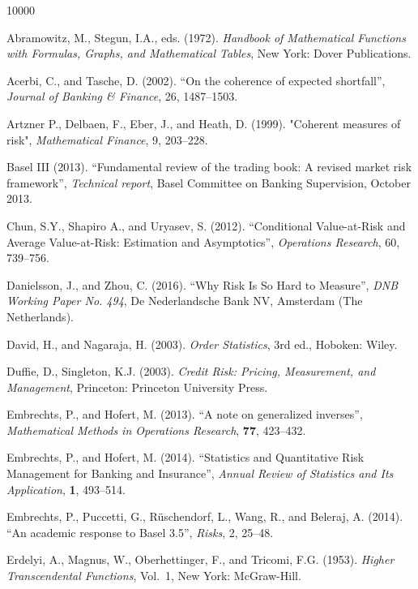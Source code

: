 \documentclass[11pt]{article}
\newcommand{\nc}{\normalcolor}
\begin{document}
\begin{thebibliography}{10000}

Abramowitz, M., Stegun, I.A., eds. (1972). \emph{Handbook of
Mathematical Functions with Formulas, Graphs, and Mathematical Tables},
New York: Dover Publications.\nc

Acerbi, C., and Tasche, D. (2002). ``On the coherence of expected
shortfall'', \emph{Journal of Banking \& Finance}, 26, 1487--1503. 

Artzner P., Delbaen, F., Eber, J., and Heath, D. (1999). "Coherent
measures of risk", {\it Mathematical Finance}, 9, 203--228.


Basel III (2013). ``Fundamental review of the
trading book: A revised market risk framework'', \emph{Technical report}, Basel
Committee on Banking Supervision, October 2013.\nc

Chun, S.Y., Shapiro A., and Uryasev, S. (2012). ``Conditional Value-at-Risk and Average Value-at-Risk: Estimation and Asymptotics'', \emph{Operations Research}, 60, 739--756.


Danielsson, J., and Zhou, C. (2016). ``Why Risk Is So Hard to
Measure'', \emph{DNB Working Paper No. 494}, De Nederlandsche Bank NV,
Amsterdam (The Netherlands).

David, H., and Nagaraja, H. (2003). \emph{Order Statistics}, 3rd
ed., Hoboken: Wiley.

Duffie, D., Singleton, K.J. (2003). \emph{Credit Risk: Pricing, Measurement, and
Management}, Princeton: Princeton University Press.

Embrechts, P., and Hofert, M. (2013). ``A note on generalized inverses'',
\emph{Mathematical Methods in Operations Research}, \textbf{77}, 423--432. 

Embrechts, P., and Hofert, M. (2014). ``Statistics and Quantitative
Risk Management for Banking and Insurance'',
\emph{Annual Review of Statistics and Its Application}, \textbf{1}, 493--514. 

Embrechts, P., Puccetti, G., R{\"u}schendorf, L., Wang, R., and
Beleraj, A. (2014). ``An academic response to Basel 3.5'',
\emph{Risks}, 2, 25--48.

Erdelyi, A., Magnus, W., Oberhettinger, F., and Tricomi, F.G. (1953). \emph{Higher Transcendental Functions}, Vol.~1, New York: McGraw-Hill. 


\end{thebibliography}
\end{document}
